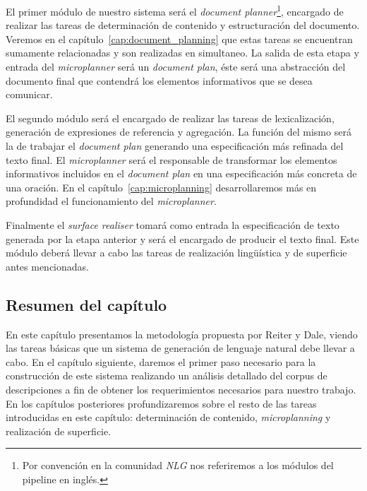 El primer módulo de nuestro sistema será el \emph{document planner}\footnote{Por convención en la comunidad \textit{NLG} nos referiremos a los módulos del {pipeline} en inglés.}, encargado de realizar las tareas de determinación de contenido y estructuración del documento. Veremos en el capítulo~\ref{cap:document_planning} que estas tareas se encuentran sumamente relacionadas y son realizadas en simultaneo. La salida de esta etapa y entrada del \emph{microplanner} será un \emph{document plan}, éste será una abstracción del documento final que contendrá los elementos informativos que se desea comunicar.

El segundo módulo será el encargado de realizar las tareas de lexicalización, generación de expresiones de referencia y agregación. La función del mismo será la de trabajar el \textit{document plan} generando una especificación más refinada del texto final. El \emph{microplanner} será el responsable de transformar los elementos informativos incluidos en el \textit{document plan} en una especificación más concreta de una oración. En el capítulo~\ref{cap:microplanning} desarrollaremos más en profundidad el funcionamiento del \textit{microplanner}.

Finalmente el \emph{surface realiser} tomará como entrada la especificación de texto generada por la etapa anterior y será el encargado de producir el texto final. Este módulo deberá llevar a cabo las tareas de realización lingüística y de superficie antes mencionadas.

\subsection{Resumen del capítulo}
En este capítulo presentamos la metodología propuesta por Reiter y Dale, viendo las tareas básicas que un sistema de generación de lenguaje natural debe llevar a cabo. En el capítulo siguiente, daremos el primer paso necesario para la construcción de este sistema realizando un análisis detallado del corpus de descripciones a fin de obtener los requerimientos necesarios para nuestro trabajo. En los capítulos posteriores profundizaremos sobre el resto de las tareas introducidas en este capítulo: determinación de contenido, \textit{microplanning} y realización de superficie.